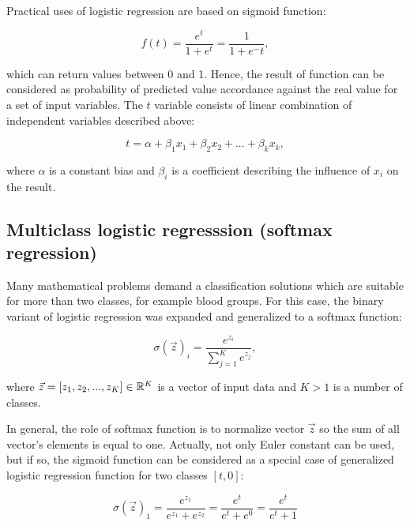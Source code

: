 \documentclass[energies,article,submit,pdftex,moreauthors]{Definitions/mdpi}
\begin{document}
\vspace{5mm}
Practical uses of logistic regression are based on sigmoid function:
\begin{linenomath}
\begin{equation}
f(t) = \frac{e^t}{1+e^t} = \frac{1}{1+e^-t},
\end{equation}
\end{linenomath}
which can return values between 0 and 1. Hence, the result of function can be considered as probability of predicted value accordance against the real value for a set of input variables. The $ t $ variable consists of linear combination of independent variables described above:
\begin{linenomath}
\begin{equation}
t = \alpha + \beta_1 x_1 + \beta_2 x_2 + ... + \beta_k x_k,
\end{equation}
\end{linenomath}
where $ \alpha $ is a constant bias and $ \beta_i $ is a coefficient describing the influence of $ x_i $ on the result.

\vspace{5mm}
\subsection{Multiclass logistic regresssion (softmax regression) }

Many mathematical problems demand a classification solutions which are suitable for more than two classes, for example blood groups. For this case, the binary variant of logistic regression was expanded and generalized to a softmax function:
\begin{linenomath}
\begin{equation}
\sigma(\vec{z})_i = \frac{e^{z_i}}{\sum_{j=1}^{K} e^{z_j}},
\end{equation}
\end{linenomath}
where $\vec{z} = [z_1, z_2, ..., z_K] \in {\Bbb R}^K$ is a vector of input data and $ K > 1 $ is a number of classes.

In general, the role of softmax function is to normalize vector $\vec{z}$ so the sum of all vector's elements is equal to one. Actually, not only Euler constant can be used, but if so, the sigmoid function can be considered as a special case of generalized logistic regression function for two classes $[t, 0]$:
\begin{linenomath}
\begin{equation}
\sigma(\vec{z})_1 = \frac{e^{z_1}}{e^{z_1}+e^{z_2}} = \frac{e^{t}}{e^{t}+e^{0}} = \frac{e^{t}}{e^{t}+1}
\end{equation}
\end{linenomath}
\end{document}
